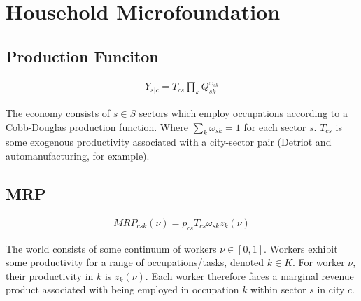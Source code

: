 \documentclass[10pt]{article}
\begin{document}





\section{Household Microfoundation}

\subsection{Production Funciton}

\begin{align}
    Y_{s | c} = T_{cs} \prod_{k} Q_{sk}^{\omega_{sk}}
\end{align}

The economy consists of $s \in S$ sectors which employ occupations according to a Cobb-Douglas production function. Where $\sum_{k}^{} \omega_{sk} = 1$ for each sector $s$. $T_{cs}$ is some exogenous productivity associated with a city-sector pair (Detriot and automanufacturing, for example).

\subsection{MRP}

\begin{align}
    {MRP}_{csk}(\nu) = {p_{cs}}{T_{cs}}{\omega_{sk}}{z_{k}(\nu)}
\end{align}

The world consists of some continuum of workers $\nu \in [0, 1]$. Workers exhibit some productivity for a range of occupations/tasks, denoted $k \in K$. For worker $\nu$, their productivity in $k$ is $z_{k}(\nu)$. Each worker therefore faces a marginal revenue product associated with being employed in occupation $k$ within sector $s$ in city $c$.
\end{document}
